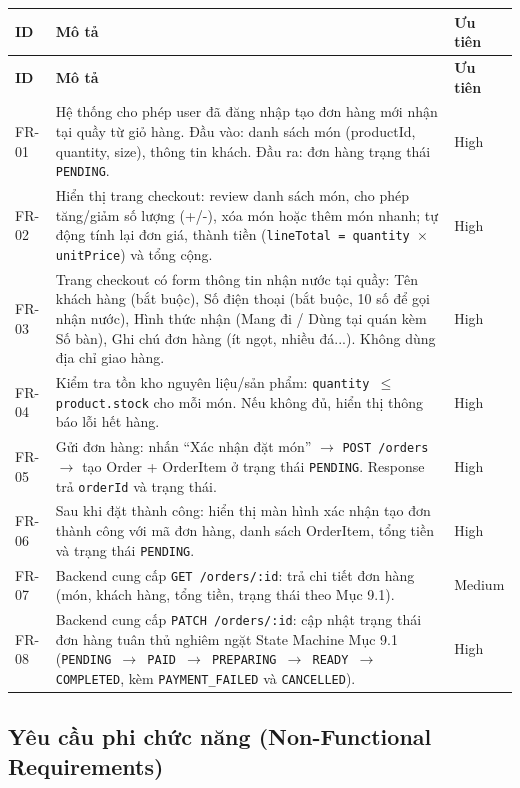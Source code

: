 \documentclass[12pt,a4paper]{article}
\begin{document}
\begin{longtable}{|l|p{9cm}|l|}
\hline
\textbf{ID} & \textbf{Mô tả} & \textbf{Ưu tiên} \\
\hline
\endfirsthead
\hline
\textbf{ID} & \textbf{Mô tả} & \textbf{Ưu tiên} \\
\hline
\endhead

FR-01 & Hệ thống cho phép user đã đăng nhập tạo đơn hàng mới nhận tại quầy từ giỏ hàng. Đầu vào: danh sách món (productId, quantity, size), thông tin khách. Đầu ra: đơn hàng trạng thái \texttt{PENDING}. & High \\
\hline
FR-02 & Hiển thị trang checkout: review danh sách món, cho phép tăng/giảm số lượng (+/-), xóa món hoặc thêm món nhanh; tự động tính lại đơn giá, thành tiền (\texttt{lineTotal = quantity $\times$ unitPrice}) và tổng cộng. & High \\
\hline
FR-03 & Trang checkout có form thông tin nhận nước tại quầy: Tên khách hàng (bắt buộc), Số điện thoại (bắt buộc, 10 số để gọi nhận nước), Hình thức nhận (Mang đi / Dùng tại quán kèm Số bàn), Ghi chú đơn hàng (ít ngọt, nhiều đá...). Không dùng địa chỉ giao hàng. & High \\
\hline
FR-04 & Kiểm tra tồn kho nguyên liệu/sản phẩm: \texttt{quantity $\leq$ product.stock} cho mỗi món. Nếu không đủ, hiển thị thông báo lỗi hết hàng. & High \\
\hline
FR-05 & Gửi đơn hàng: nhấn ``Xác nhận đặt món'' $\to$ \texttt{POST /orders} $\to$ tạo Order + OrderItem ở trạng thái \texttt{PENDING}. Response trả \texttt{orderId} và trạng thái. & High \\
\hline
FR-06 & Sau khi đặt thành công: hiển thị màn hình xác nhận tạo đơn thành công với mã đơn hàng, danh sách OrderItem, tổng tiền và trạng thái \texttt{PENDING}. & High \\
\hline
FR-07 & Backend cung cấp \texttt{GET /orders/:id}: trả chi tiết đơn hàng (món, khách hàng, tổng tiền, trạng thái theo Mục 9.1). & Medium \\
\hline
FR-08 & Backend cung cấp \texttt{PATCH /orders/:id}: cập nhật trạng thái đơn hàng tuân thủ nghiêm ngặt State Machine Mục 9.1 (\texttt{PENDING $\to$ PAID $\to$ PREPARING $\to$ READY $\to$ COMPLETED}, kèm \texttt{PAYMENT\_FAILED} và \texttt{CANCELLED}). & High \\
\hline
\end{longtable}

\subsection{Yêu cầu phi chức năng (Non-Functional Requirements)}
\end{document}
